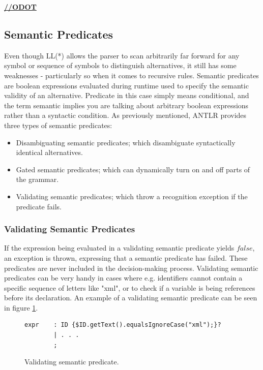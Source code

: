 \underline{\textbf{\LARGE //ODOT}}

\subsection{Semantic Predicates}
\label{sect:antlr:semantic_preds}
Even though LL(*) allows the parser to scan arbitrarily far forward for any symbol or sequence of symbols to distinguish alternatives, it still has some weaknesses - particularly so when it comes to recursive rules. Semantic predicates are boolean expressions evaluated during runtime used to specify the semantic validity of an alternative. Predicate in this case simply means conditional, and the term semantic implies you are talking about arbitrary boolean expressions rather than a syntactic condition.  As previously mentioned, ANTLR provides three types of semantic predicates:
\begin{itemize}
\item Disambiguating semantic predicates; which disambiguate syntactically identical alternatives.
\item Gated semantic predicates; which can dynamically turn on and off parts of the grammar.
\item Validating semantic predicates; which throw a recognition exception if the predicate fails.
\end{itemize}

\subsubsection{Validating Semantic Predicates}
If the expression being evaluated in a validating semantic predicate yields $false$, an exception is thrown, expressing that a semantic predicate has failed. These predicates are never included in the decision-making process. Validating semantic predicates can be very handy in cases where e.g. identifiers cannot contain a specific sequence of letters like "xml", or to check if a variable is being references before its declaration. An example of a validating semantic predicate can be seen in figure \ref{code:validateSemantic}.

\begin{figure}[h!]
\begin{verbatim}
expr    : ID {$ID.getText().equalsIgnoreCase("xml");}?
        | . . .
        ;
\end{verbatim}
\caption{Validating semantic predicate.}
\label{code:validateSemantic}
\end{figure}

